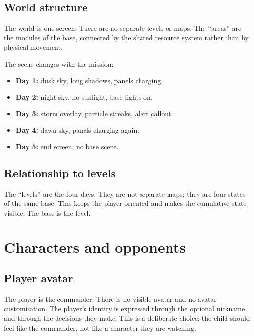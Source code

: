 \documentclass[11pt,a4paper]{article}
\begin{document}
\subsection{World structure}

The world is one screen. There are no separate levels or maps. The ``areas'' are the modules of the base, connected by the shared resource system rather than by physical movement.

The scene changes with the mission:

\begin{itemize}
  \item \textbf{Day 1:} dusk sky, long shadows, panels charging.
  \item \textbf{Day 2:} night sky, no sunlight, base lights on.
  \item \textbf{Day 3:} storm overlay, particle streaks, alert callout.
  \item \textbf{Day 4:} dawn sky, panels charging again.
  \item \textbf{Day 5:} end screen, no base scene.
\end{itemize}

\subsection{Relationship to levels}

The ``levels'' are the four days. They are not separate maps; they are four states of the same base. This keeps the player oriented and makes the cumulative state visible. The base is the level.

\section{Characters and opponents}

\subsection{Player avatar}

The player is the commander. There is no visible avatar and no avatar customisation. The player's identity is expressed through the optional nickname and through the decisions they make. This is a deliberate choice: the child should feel like the commander, not like a character they are watching.
\end{document}
